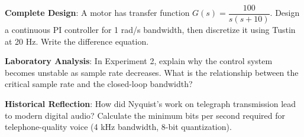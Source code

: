 \begin{exercise}
\textbf{Complete Design}: A motor has transfer function $G(s) = \dfrac{100}{s(s+10)}$. Design a continuous PI controller for 1 rad/s bandwidth, then discretize it using Tustin at 20 Hz. Write the difference equation.
\end{exercise}

\begin{exercise}
\textbf{Laboratory Analysis}: In Experiment 2, explain why the control system becomes unstable as sample rate decreases. What is the relationship between the critical sample rate and the closed-loop bandwidth?
\end{exercise}

\begin{exercise}
\textbf{Historical Reflection}: How did Nyquist's work on telegraph transmission lead to modern digital audio? Calculate the minimum bits per second required for telephone-quality voice (4 kHz bandwidth, 8-bit quantization).
\end{exercise}

